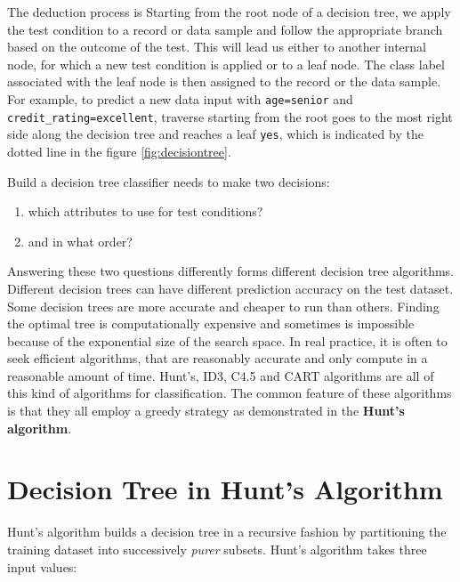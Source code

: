 \documentclass[
]{book}
\providecommand{\tightlist}{%
  \setlength{\itemsep}{0pt}\setlength{\parskip}{0pt}}
\begin{document}
The deduction process is Starting from the root node of a decision tree, we apply the test condition to a record or data sample and follow the appropriate branch based on the outcome of the test. This will lead us either to another internal node, for which a new test condition is applied or to a leaf node. The class label associated with the leaf node is then assigned to the record or the data sample. For example, to predict a new data input with \texttt{\textquotesingle{}age=senior\textquotesingle{}} and \texttt{\textquotesingle{}credit\_rating=excellent\textquotesingle{}}, traverse starting from the root goes to the most right side along the decision tree and reaches a leaf \texttt{yes}, which is indicated by the dotted line in the figure \ref{fig:decisiontree}.

Build a decision tree classifier needs to make two decisions:

\begin{enumerate}
\def\labelenumi{\arabic{enumi})}
\tightlist
\item
  which attributes to use for test conditions?
\item
  and in what order?
\end{enumerate}

Answering these two questions differently forms different decision tree algorithms. Different decision trees can have different prediction accuracy on the test dataset. Some decision trees are more accurate and cheaper to run than others. Finding the optimal tree is computationally expensive and sometimes is impossible because of the exponential size of the search space. In real practice, it is often to seek efficient algorithms, that are reasonably accurate and only compute in a reasonable amount of time. Hunt's, ID3, C4.5 and CART algorithms are all of this kind of algorithms for classification. The common feature of these algorithms is that they all employ a greedy strategy as demonstrated in the \textbf{Hunt's algorithm}.

\hypertarget{decision-tree-in-hunts-algorithm}{%
\section{Decision Tree in Hunt's Algorithm}\label{decision-tree-in-hunts-algorithm}}

Hunt's algorithm builds a decision tree in a recursive fashion by partitioning the training dataset into successively \emph{purer} subsets. Hunt's algorithm takes three input values:
\end{document}
